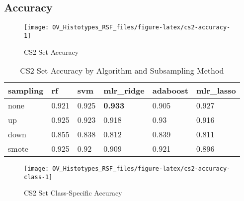 \documentclass[
]{report}
\begin{document}
\hypertarget{accuracy-3}{%
\subsection{Accuracy}\label{accuracy-3}}

\begin{figure}[H]

{\centering \texttt{[image: OV\_Histotypes\_RSF\_files/figure-latex/cs2-accuracy-1]} 

}

\caption{CS2 Set Accuracy}\label{fig:cs2-accuracy}
\end{figure}

\begin{table}

\caption{\label{tab:cs2-accuracy-table}CS2 Set Accuracy by Algorithm and Subsampling Method}
\centering
\begin{tabular}[t]{l|l|l|l|l|l}
\hline
sampling & rf & svm & mlr\_ridge & adaboost & mlr\_lasso\\
\hline
none & 0.921 & 0.925 & \textbf{0.933} & 0.905 & 0.927\\
\hline
up & 0.925 & 0.923 & 0.918 & 0.93 & 0.916\\
\hline
down & 0.855 & 0.838 & 0.812 & 0.839 & 0.811\\
\hline
smote & 0.925 & 0.92 & 0.909 & 0.921 & 0.896\\
\hline
\end{tabular}
\end{table}

\begin{figure}[H]

{\centering \texttt{[image: OV\_Histotypes\_RSF\_files/figure-latex/cs2-accuracy-class-1]} 

}

\caption{CS2 Set Class-Specific Accuracy}\label{fig:cs2-accuracy-class}
\end{figure}
\end{document}
